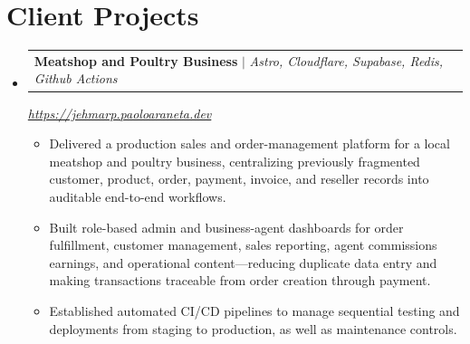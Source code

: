 \documentclass[letterpaper,11pt]{article}
\makeatletter
\newcommand{\resumeItem}[1]{
  \item\small{
    {#1 \vspace{0pt}}
  }
}
\newcommand{\resumeProjectHeadingWithSubline}[2]{
    \item
    \begin{tabular*}{1.001\textwidth}{l@{\extracolsep{\fill}}r}
      \small#1 & \\
    \end{tabular*}\vspace{1mm}
    {\small #2\par}\vspace{-7pt}
}
\newcommand{\resumeSubHeadingListStart}{\begin{itemize}[leftmargin=0.0in, label={}]}
\newcommand{\resumeSubHeadingListEnd}{\end{itemize}}\vspace{0pt}
\newcommand{\resumeItemListStart}{\begin{itemize}}
\newcommand{\resumeItemListEnd}{\end{itemize}\vspace{-5pt}}
\makeatother
\begin{document}
\section{Client Projects}
    \vspace{-5pt}
    \resumeSubHeadingListStart
    \resumeProjectHeadingWithSubline
      {\textbf{Meatshop and Poultry Business} $|$ \emph{Astro, Cloudflare, Supabase, Redis, Github Actions}}
      {\emph{\href{https://jehmarp.paoloaraneta.dev}{https://jehmarp.paoloaraneta.dev}}}
      \resumeItemListStart
        \resumeItem{Delivered a production sales and order-management platform for a local meatshop and poultry business, centralizing previously fragmented customer, product, order, payment, invoice, and reseller records into auditable end-to-end workflows.}
        \resumeItem{Built role-based admin and business-agent dashboards for order fulfillment, customer management, sales reporting, agent commissions earnings, and operational content---reducing duplicate data entry and making transactions traceable from order creation through payment.}
        \resumeItem{Established automated CI/CD pipelines to manage sequential testing and deployments from staging to production, as well as maintenance controls.}
      \resumeItemListEnd
\resumeSubHeadingListEnd
\vspace{-12pt}

\end{document}

